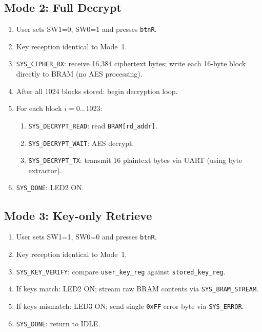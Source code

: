 \documentclass[12pt,a4paper]{article}
\begin{document}
\subsection{Mode 2: Full Decrypt}

\begin{enumerate}[leftmargin=*, label=\textbf{Step \arabic*.}]
\item User sets SW1=0, SW0=1 and presses \texttt{btnR}.
\item Key reception identical to Mode~1.
\item \texttt{SYS\_CIPHER\_RX}: receive 16,384 ciphertext bytes; write each 16-byte block directly to BRAM (no AES processing).
\item After all 1024 blocks stored: begin decryption loop.
\item For each block $i = 0 \ldots 1023$:
  \begin{enumerate}[label=\alph*.]
    \item \texttt{SYS\_DECRYPT\_READ}: read \texttt{BRAM[rd\_addr]}.
    \item \texttt{SYS\_DECRYPT\_WAIT}: AES decrypt.
    \item \texttt{SYS\_DECRYPT\_TX}: transmit 16 plaintext bytes via UART (using byte extractor).
  \end{enumerate}
\item \texttt{SYS\_DONE}: LED2 ON.
\end{enumerate}

\subsection{Mode 3: Key-only Retrieve}

\begin{enumerate}[leftmargin=*, label=\textbf{Step \arabic*.}]
\item User sets SW1=1, SW0=0 and presses \texttt{btnR}.
\item Key reception identical to Mode~1.
\item \texttt{SYS\_KEY\_VERIFY}: compare \texttt{user\_key\_reg} against \texttt{stored\_key\_reg}.
\item If keys match: LED2 ON; stream raw BRAM contents via \texttt{SYS\_BRAM\_STREAM}.
\item If keys mismatch: LED3 ON; send single \texttt{0xFF} error byte via \texttt{SYS\_ERROR}.
\item \texttt{SYS\_DONE}: return to IDLE.
\end{enumerate}
\end{document}
